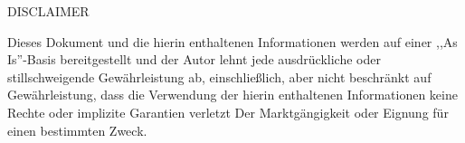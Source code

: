 \begin{center}
    {\Large DISCLAIMER}
\end{center}

Dieses Dokument und die hierin enthaltenen Informationen werden auf einer ,,As Is''-Basis bereitgestellt und der Autor lehnt jede ausdrückliche oder stillschweigende Gewährleistung ab, einschließlich, aber nicht beschränkt auf Gewährleistung, dass die Verwendung der hierin enthaltenen Informationen keine Rechte oder implizite Garantien verletzt Der Marktgängigkeit oder Eignung für einen bestimmten Zweck.
